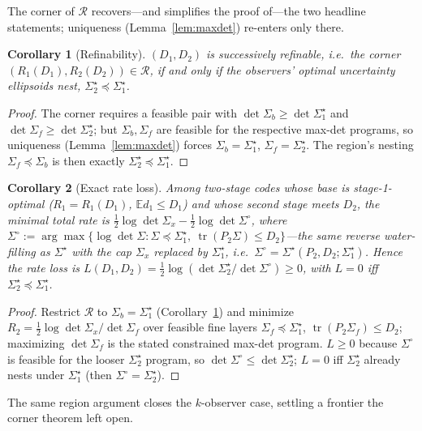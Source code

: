 \documentclass[lettersize,onecolumn]{IEEEtran}
\newtheorem{corollary}{Corollary}
\theoremstyle{definition}
\theoremstyle{remark}
\newcommand{\tr}{\operatorname{tr}}
\newcommand{\E}{\mathbb{E}}
\begin{document}
The corner of $\mathcal R$ recovers---and simplifies the proof of---the two headline
statements; uniqueness (Lemma~\ref{lem:maxdet}) re-enters only there.

\begin{corollary}[Refinability]\label{thm:multiobs}
$(D_1,D_2)$ is successively refinable, i.e.\ the corner $(R_1(D_1),R_2(D_2))\in\mathcal
R$, if and only if the observers' optimal uncertainty ellipsoids nest,
$\Sigma_2^\star\preceq\Sigma_1^\star$.
\end{corollary}
\begin{proof}
The corner requires a feasible pair with $\det\Sigma_b\ge\det\Sigma_1^\star$ and
$\det\Sigma_f\ge\det\Sigma_2^\star$; but $\Sigma_b,\Sigma_f$ are feasible for the
respective max-det programs, so uniqueness (Lemma~\ref{lem:maxdet}) forces
$\Sigma_b=\Sigma_1^\star$, $\Sigma_f=\Sigma_2^\star$. The region's nesting
$\Sigma_f\preceq\Sigma_b$ is then exactly $\Sigma_2^\star\preceq\Sigma_1^\star$.
\end{proof}

\begin{corollary}[Exact rate loss]\label{thm:multiobs-loss}
Among two-stage codes whose base is stage-1-optimal ($R_1=R_1(D_1)$, $\E d_1\le D_1$) and
whose second stage meets $D_2$, the minimal total rate is $\tfrac12\log\det\Sigma_x-
\tfrac12\log\det\Sigma^\circ$, where $\Sigma^\circ:=\arg\max\{\log\det\Sigma:\Sigma
\preceq\Sigma_1^\star,\ \tr(P_2\Sigma)\le D_2\}$---the \emph{same} reverse water-filling
as $\Sigma^\star$ with the cap $\Sigma_x$ replaced by $\Sigma_1^\star$, i.e.\
$\Sigma^\circ=\Sigma^\star(P_2,D_2;\Sigma_1^\star)$. Hence the rate loss is
$L(D_1,D_2)=\tfrac12\log(\det\Sigma_2^\star/\det\Sigma^\circ)\ge0$, with $L=0$ iff
$\Sigma_2^\star\preceq\Sigma_1^\star$.
\end{corollary}
\begin{proof}
Restrict $\mathcal R$ to $\Sigma_b=\Sigma_1^\star$ (Corollary~\ref{thm:multiobs}) and
minimize $R_2=\tfrac12\log\det\Sigma_x/\det\Sigma_f$ over feasible fine layers
$\Sigma_f\preceq\Sigma_1^\star$, $\tr(P_2\Sigma_f)\le D_2$; maximizing $\det\Sigma_f$ is
the stated constrained max-det program. $L\ge0$ because $\Sigma^\circ$ is feasible for
the looser $\Sigma_2^\star$ program, so $\det\Sigma^\circ\le\det\Sigma_2^\star$; $L=0$ iff
$\Sigma_2^\star$ already nests under $\Sigma_1^\star$ (then $\Sigma^\circ=\Sigma_2^\star$).
\end{proof}

The same region argument closes the $k$-observer case, settling a frontier the corner
theorem left open.
\end{document}
